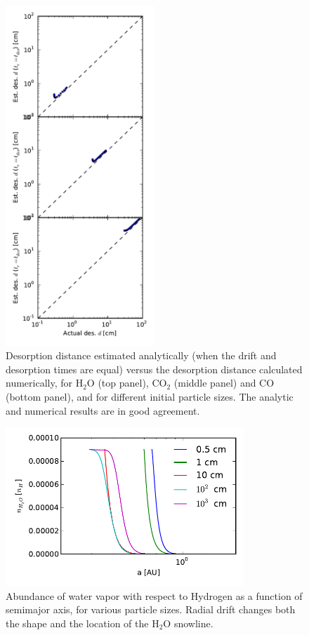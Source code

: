 \documentclass[12pt, preprint]{aastex}
\begin{document}
\begin{figure}[htb]
\centering
\includegraphics[width=0.5\textwidth]{../figs/desorption_distance_actual_vs_estimated.pdf}
\caption{Desorption distance estimated analytically (when the drift and desorption times are equal) versus the desorption distance calculated numerically, for H$_2$O (top panel), CO$_2$ (middle panel) and CO (bottom panel), and for different initial particle sizes. The analytic and numerical results are in good agreement.} %
\label{fig:an_vs_num}
\end{figure}

\begin{figure}[htb]
\centering
\includegraphics[width=0.8\textwidth]{../figs/nH2O_no_acc.pdf}
\caption{Abundance of water vapor with respect to Hydrogen as a function of semimajor axis, for various particle sizes. Radial drift changes both the shape and the location of the H$_2$O snowline.} %
\label{fig:nwater_drift}
\end{figure}
\end{document}
